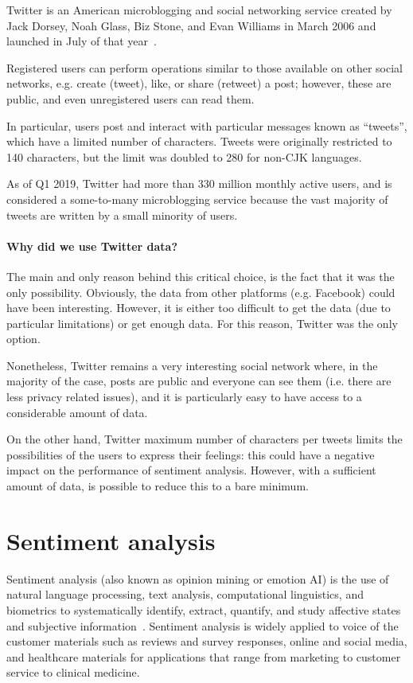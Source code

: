 Twitter is an American microblogging and social networking service created by Jack Dorsey, Noah Glass, Biz Stone, and Evan Williams in March 2006 and launched in July of that year~\cite{enwiki:1027840990}.

Registered users can perform operations similar to those available on other social networks, e.g. create (tweet), like, or share (retweet) a post; however, these are public, and even unregistered users can read them. 

In particular, users post and interact with particular messages known as “tweets”, which have a limited number of characters. Tweets were originally restricted to 140 characters, but the limit was doubled to 280 for non-CJK languages.

As of Q1 2019, Twitter had more than 330 million monthly active users, and is considered a some-to-many microblogging service because the vast majority of tweets are written by a small minority of users.

\paragraph{Why did we use Twitter data?}

The main and only reason behind this critical choice, is the fact that it was the only possibility. Obviously, the data from other platforms (e.g. Facebook) could have been interesting. However, it is either too difficult to get the data (due to particular limitations) or get enough data. For this reason, Twitter was the only option.

Nonetheless, Twitter remains a very interesting social network where, in the majority of the case, posts are public and everyone can see them (i.e. there are less privacy related issues), and it is particularly easy to have access to a considerable amount of data.

On the other hand, Twitter maximum number of characters per tweets limits the possibilities of the users to express their feelings: this could have a negative impact on the performance of sentiment analysis. However, with a sufficient amount of data, is possible to reduce this to a bare minimum. 

\section{Sentiment analysis}
\label{sec:sentiment-analysis}

Sentiment analysis (also known as opinion mining or emotion AI) is the use of natural language processing, text analysis, computational linguistics, and biometrics to systematically identify, extract, quantify, and study affective states and subjective information~\cite{enwiki:1024880646}. Sentiment analysis is widely applied to voice of the customer materials such as reviews and survey responses, online and social media, and healthcare materials for applications that range from marketing to customer service to clinical medicine.

